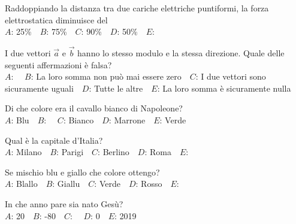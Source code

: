 \mcquestionfooter



\def\mcquestionnumber{5}


\mcquestionheader Raddoppiando la distanza tra due cariche elettriche puntiformi, la forza elettrostatica diminuisce del\\
{$A$}: 25\%\ \ {$B$}: 75\%\ \ {$C$}: 90\%\ \ {$D$}: 50\%\ \ {$E$}: \ \ 

\mcquestionfooter



\def\mcquestionnumber{6}


\mcquestionheader I due vettori $\vec{a}$ e $\vec{b}$ hanno lo stesso modulo e la stessa direzione. Quale delle seguenti affermazioni è falsa?\\
{$A$}: \ \ {$B$}: La loro somma non può mai essere zero\ \ {$C$}: I due vettori sono sicuramente uguali\ \ {$D$}: Tutte le altre\ \ {$E$}: La loro somma è sicuramente nulla\ \ 

\mcquestionfooter



\def\mcquestionnumber{7}


\mcquestionheader Di che colore era il cavallo bianco di Napoleone?\\
{$A$}: Blu\ \ {$B$}: \ \ {$C$}: Bianco\ \ {$D$}: Marrone\ \ {$E$}: Verde\ \ 

\mcquestionfooter



\def\mcquestionnumber{8}


\mcquestionheader Qual è la capitale d’Italia?\\
{$A$}: Milano\ \ {$B$}: Parigi\ \ {$C$}: Berlino\ \ {$D$}: Roma\ \ {$E$}: \ \ 

\mcquestionfooter



\def\mcquestionnumber{9}


\mcquestionheader Se mischio blu e giallo che colore ottengo?\\
{$A$}: Blallo\ \ {$B$}: Giallu\ \ {$C$}: Verde\ \ {$D$}: Rosso\ \ {$E$}: \ \ 

\mcquestionfooter



\def\mcquestionnumber{10}


\mcquestionheader In che anno pare sia nato Gesù?\\
{$A$}: 20\ \ {$B$}: -80\ \ {$C$}: \ \ {$D$}: 0\ \ {$E$}: 2019\ \ 

\mcquestionfooter



